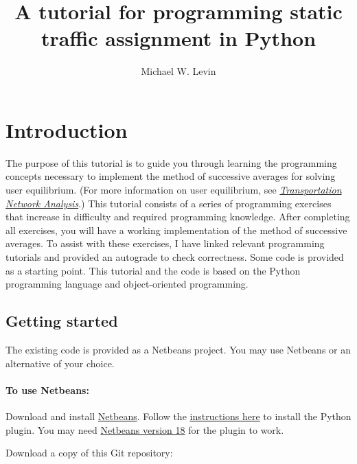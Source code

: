 \documentclass[11pt]{article}
\begin{document}
	\allowdisplaybreaks[1]
	
	
	\title{A tutorial for programming static traffic assignment in Python}
	
	\author{Michael W. Levin}
	
	\maketitle
	
\section{Introduction}

The purpose of this tutorial is to guide you through learning the programming concepts necessary to implement the method of successive averages for solving user equilibrium. (For more information on user equilibrium, see \href{https://sboyles.github.io/blubook.html}{\textit{Transportation Network Analysis}}.)
This tutorial consists of a series of programming exercises that increase in difficulty and required programming knowledge. After completing all exercises, you will have a working implementation of the method of successive averages. 
To assist with these exercises, I have linked relevant programming tutorials and provided an autograde to check correctness. Some code is provided as a starting point. 
This tutorial and the code is based on the Python programming language and object-oriented programming.
%


\subsection{Getting started}
\label{sec11}

The existing code is provided as a Netbeans project. You may use Netbeans or an alternative of your choice.
\paragraph*{To use Netbeans:} Download and install \href{https://netbeans.apache.org/download/index.html}{Netbeans}. Follow the \href{https://plugins.netbeans.apache.org/catalogue/?id=89}{instructions here} to install the Python plugin. You may need \href{https://netbeans.apache.org/download/nb18/}{Netbeans version 18} for the plugin to work.

 Download a copy of this Git repository:
\end{document}
